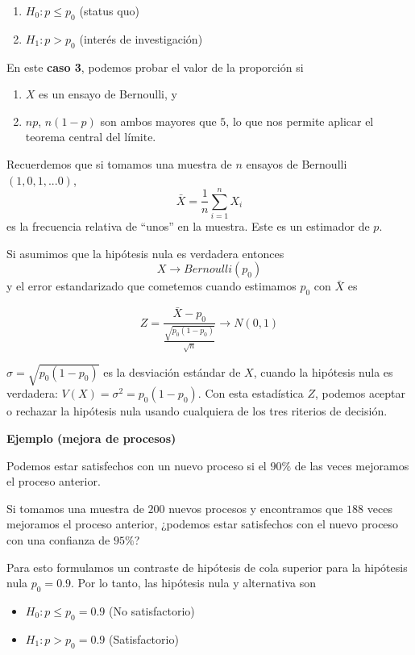\documentclass[
]{book}
\providecommand{\tightlist}{%
  \setlength{\itemsep}{0pt}\setlength{\parskip}{0pt}}
\begin{document}
\begin{enumerate}
\def\labelenumi{\alph{enumi}.}
\tightlist
\item
  \(H_0: p \leq p_0\) (status quo)
\item
  \(H_1: p> p_0\) (interés de investigación)
\end{enumerate}

En este \textbf{caso 3}, podemos probar el valor de la proporción si

\begin{enumerate}
\def\labelenumi{\arabic{enumi}.}
\tightlist
\item
  \(X\) es un ensayo de Bernoulli, y
\item
  \(np\), \(n(1-p)\) son ambos mayores que \(5\), lo que nos permite aplicar el teorema central del límite.
\end{enumerate}

Recuerdemos que si tomamos una muestra de \(n\) ensayos de Bernoulli \((1,0,1,...0)\), \[\bar{X}=\frac{1}{n}\sum_{i=1 }^n X_i\] es la frecuencia relativa de ``unos'' en la muestra. Este es un estimador de \(p\).

Si asumimos que la hipótesis nula es verdadera entonces \[X \rightarrow Bernoulli(p_0)\] y el error estandarizado que cometemos cuando estimamos \(p_0\) con \(\bar{X}\) es

\[Z=\frac{\bar{X}-p_0}{\frac{\sqrt{p_0(1-p_0)}}{\sqrt{n}}} \rightarrow N(0,1)\]

\(\sigma=\sqrt{p_0(1-p_0)}\) es la desviación estándar de \(X\), cuando la hipótesis nula es verdadera: \(V(X)=\sigma^2=p_0(1-p_0)\). Con esta estadística \(Z\), podemos aceptar o rechazar la hipótesis nula usando cualquiera de los tres riterios de decisión.

\textbf{Ejemplo (mejora de procesos)}

Podemos estar satisfechos con un nuevo proceso si el \(90\%\) de las veces mejoramos el proceso anterior.

Si tomamos una muestra de \(200\) nuevos procesos y encontramos que \(188\) veces mejoramos el proceso anterior, ¿podemos estar satisfechos con el nuevo proceso con una confianza de \(95\%\)?

Para esto formulamos un contraste de hipótesis de cola superior para la hipótesis nula \(p_0=0.9\). Por lo tanto, las hipótesis nula y alternativa son

\begin{itemize}
\tightlist
\item
  \(H_0: p \leq p_0=0.9\) (No satisfactorio)
\item
  \(H_1: p> p_0=0.9\) (Satisfactorio)
\end{itemize}
\end{document}
